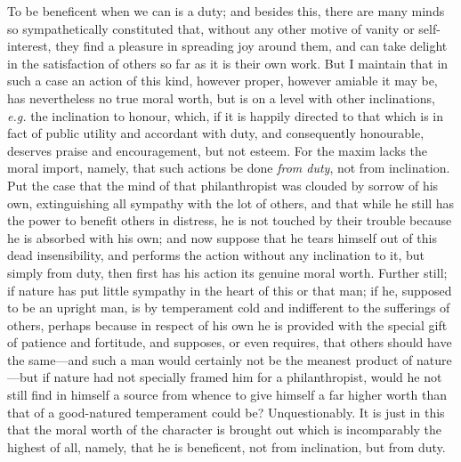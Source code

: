 To be beneficent when we can is a duty; and besides this, there are
many minds so sympathetically constituted that, without any other
motive of vanity or self-interest, they find a pleasure in spreading
joy around them, and can take delight in the satisfaction of others so
far as it is their own work. But I maintain that in such a case an
action of this kind, however proper, however amiable it may be, has
nevertheless no true moral worth, but is on a level with other
inclinations, \textit{e.g.} the inclination to honour, which, if it is
happily directed to that which is in fact of public utility and
accordant with duty, and consequently honourable, deserves praise and
encouragement, but not esteem. For the maxim lacks the moral import,
namely, that such actions be done \textit{from duty}, not from
inclination. Put the case that the mind of that philanthropist was
clouded by sorrow of his own, extinguishing all sympathy with the lot
of others, and that while he still has the power to benefit others in
distress, he is not touched by their trouble because he is absorbed
with his own; and now suppose that he tears himself out of this dead
insensibility, and performs the action without any inclination to it,
but simply from duty, then first has his action its genuine moral
worth. Further still; if nature has put little sympathy in the heart
of this or that man; if he, supposed to be an upright man, is by
temperament cold and indifferent to the sufferings of others, perhaps
because in respect of his own he is provided with the special gift of
patience and fortitude, and supposes, or even requires, that others
should have the same---and such a man would certainly not be the
meanest product of nature---but if nature had not specially framed him
for a philanthropist, would he not still find in himself a source
 from whence to give himself a far higher worth than that of
a good-natured temperament could be? Unquestionably. It is just in
this that the moral worth of the character is brought out which is
incomparably the highest of all, namely, that he is beneficent, not
from inclination, but from duty.


